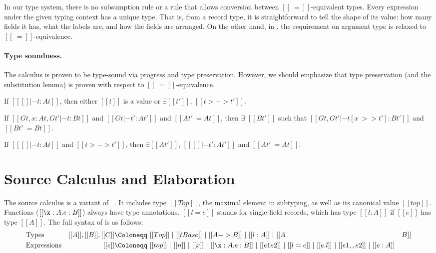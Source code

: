 In our type system, there is no subsumption rule or a rule that allows
conversion between $[[~=]]$-equivalent types. Every expression under the given
typing context has a unique type. That is, from a record type, it is
straightforward to tell the shape of its value: how many fields it has, what the
labels are, and how the fields are arranged. On the other hand, in
, the requirement on argument type is relaxed to
$[[~=]]$-equivalence.

\paragraph{Type soundness.}
The \lambdar calculus is proven to be type-sound via progress and type
preservation. However, we should emphasize that type preservation (and the
substitution lemma) is proven with respect to $[[~=]]$-equivalence.

\begin{theorem}[Progress]\label{thm:type-progress}
  If $[[ [] |-  t : At ]]$, then either $[[t]]$ is a value or
  $\exists [[t']]$, $[[t >-> t']]$.
\end{theorem}

\begin{lemma}\label{thm:subst-term}
  If $[[Gt,x:At,Gt' |- t : Bt]]$ and $[[Gt|- t' : At']]$ and $[[ At' ~= At ]]$,
  then $\exists$ $[[Bt']]$ such that $[[Gt, Gt' |- t[x ~>> t']: Bt']]$ and $[[Bt' ~= Bt]]$.
\end{lemma}

\begin{theorem}\label{thm:type-preservation}
  If $[[ [] |-  t : At ]]$ and $[[t >-> t']]$, then
  $\exists [[At']]$,
    $[[  []  |-  t' : At' ]]$ and $[[ At' ~= At ]]$.
\end{theorem}

\section{Source Calculus and Elaboration}

The source calculus is a variant of
\lambdaiplus~\citep{bi2018essence,huang2021taming}. It includes type $[[Top]]$,
the maximal element in subtyping, as well as its canonical value $[[top]]$.
Functions ($[[\x:A.e:B]]$) always have type annotations. $[[{l=e}]]$ stands for
single-field records, which has type $[[ {l:A} ]]$ if $[[e]]$ has type $[[A]]$.
The full syntax of \lambdaiplus is as follows:
{%
    \begin{align*}
      &\text{Types}        &[[A]], [[B]], [[C]] \Coloneqq&~ [[Top]]~|~ [[tBase]] ~|~ [[A -> B]] ~|~ [[ {l:A} ]] ~|~ [[A&B]] \\
      &\text{Expressions}    &[[e]]    \Coloneqq&~ [[top]] ~|~ [[n]] ~|~ [[x]] ~|~ [[\x:A.e:B]] ~|~ [[e1 e2]] ~|~ [[{l=e}]] ~|~ [[e.l]] ~|~ [[e1,,e2]] ~|~ [[e:A]]
    \end{align*}
}

